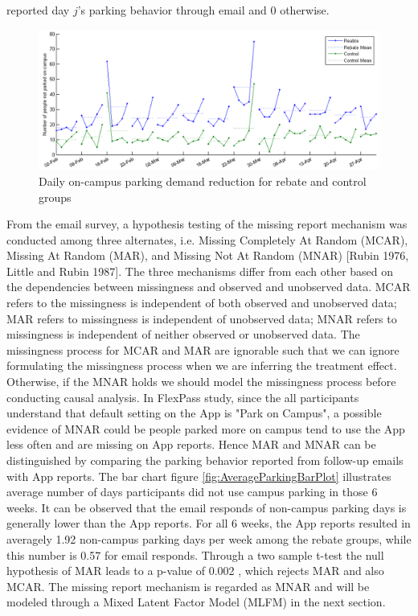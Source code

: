 \documentclass[preprint,12pt]{elsarticle}
\begin{document}
reported day $j$'s parking behavior through email and 0 otherwise.\\

 \begin{figure}[!htb]
\centering
\includegraphics[scale=0.6]{AppReportRaw.png}
\caption{Daily on-campus parking demand reduction for rebate and control groups}
\label{fig:Raw_time_series}
\end{figure}

From the email survey, a hypothesis testing of the missing report mechanism was conducted among three alternates, i.e. Missing Completely At Random (MCAR), Missing At Random (MAR), and Missing Not At Random (MNAR) [Rubin 1976, Little and Rubin 1987]. The three mechanisms differ from each other based on the dependencies between missingness and observed and unobserved data. MCAR refers to the missingness is independent of both observed and unobserved data; MAR refers to missingness is independent of unobserved data; MNAR refers to missingness is independent of neither observed or unobserved data. The missingness process for MCAR and MAR are ignorable such that we can ignore formulating the missingness process when we are inferring the treatment effect. Otherwise, if the MNAR holds we should model the missingness process before conducting causal analysis. In FlexPass study, since the all participants understand that default setting on the App is "Park on Campus", a possible evidence of MNAR could be people parked more on campus tend to use the App less often and are missing on App reports. Hence MAR and MNAR can be distinguished by comparing the parking behavior reported from follow-up emails with App reports. The bar chart figure \ref{fig:AverageParkingBarPlot} illustrates average number of days participants did not use campus parking in those 6 weeks. It can be observed that the email responds of non-campus parking days is generally lower than the App reports. For all 6 weeks, the App reports resulted in averagely 1.92 non-campus parking days per week among the rebate groups, while this number is 0.57 for email responds. Through a two sample t-test the null hypothesis of MAR leads to a p-value of 0.002 , which rejects MAR and also MCAR. The missing report mechanism is regarded as MNAR and will be modeled through a Mixed Latent Factor Model (MLFM) in the next section.
\end{document}
